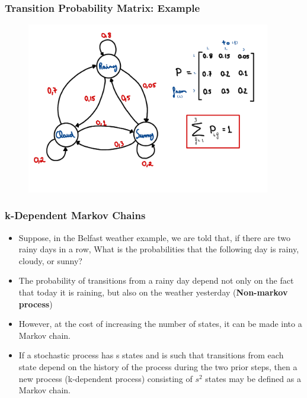 \begin{frame}
    \frametitle{Transition Probability Matrix: Example}
    \begin{figure}
        \centering
        \includegraphics[width=0.95\textwidth]{slides/figures/markov_chain_example.pdf}
    \end{figure}
\end{frame}


\begin{frame}
    \frametitle{k-Dependent Markov Chains}
    \begin{itemize}

        \item Suppose, in the Belfast weather example, we are told that, if there are two rainy days in a row,
        What is the probabilities that the following day is rainy, cloudy, or sunny? 

        \item The probability of transitions from a rainy day depend not only on the fact that today 
        it is raining, but also on the weather yesterday (\textbf{Non-markov process})

        \item However, at the cost of increasing the number of states, it can be made into a Markov chain.

        \item If a stochastic process has s states and is such that transitions from each state depend on the history 
        of the process during the two prior steps, then a new process (k-dependent process) 
        consisting of $s^2$ states may be defined as a Markov chain.
    \end{itemize}
\end{frame}


